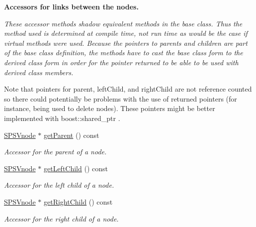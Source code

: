 \begin{Indent}{\bf \-Accessors for links between the nodes.}\par
{\em \-These accessor methods shadow equivalent methods in the base class. \-Thus the method used is determined at compile time, not run time as would be the case if virtual methods were used. \-Because the pointers to parents and children are part of the base class definition, the methods have to cast the base class form to the derived class form in order for the pointer returned to be able to be used with derived class members.

\-Note that pointers for parent, left\-Child, and right\-Child are not reference counted so there could potentially be problems with the use of returned pointers (for instance, being used to delete nodes). \-These pointers might be better implemented with boost\-::shared\-\_\-ptr . }\begin{DoxyCompactItemize}
\item 
\hyperlink{classsubpavings_1_1SPSVnode}{\-S\-P\-S\-Vnode} $\ast$ \hyperlink{classsubpavings_1_1SPSVnode_ae42cbf85bd00caf12e6acac68ae1fcd3}{get\-Parent} () const 
\begin{DoxyCompactList}\small\item\em \-Accessor for the parent of a node. \end{DoxyCompactList}\item 
\hyperlink{classsubpavings_1_1SPSVnode}{\-S\-P\-S\-Vnode} $\ast$ \hyperlink{classsubpavings_1_1SPSVnode_a3ef0b662df21eb88689644cb5d1279d2}{get\-Left\-Child} () const 
\begin{DoxyCompactList}\small\item\em \-Accessor for the left child of a node. \end{DoxyCompactList}\item 
\hyperlink{classsubpavings_1_1SPSVnode}{\-S\-P\-S\-Vnode} $\ast$ \hyperlink{classsubpavings_1_1SPSVnode_af681e178575b285f123c1c01bac9ac42}{get\-Right\-Child} () const 
\begin{DoxyCompactList}\small\item\em \-Accessor for the right child of a node. \end{DoxyCompactList}\end{DoxyCompactItemize}
\end{Indent}

